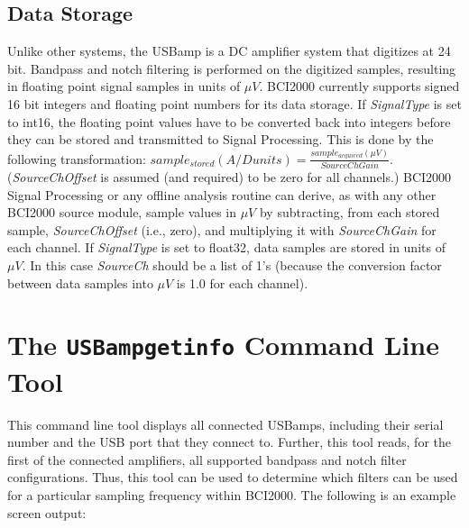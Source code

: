 \documentclass[letterpaper, oneside, 12pt]{article}
\begin{document}
\subsection{Data Storage}

Unlike other systems, the USBamp is a DC amplifier system that digitizes at 24 
bit. Bandpass and notch filtering is performed on the digitized samples, 
resulting in floating point signal samples in units of $\mu V$. BCI2000 
currently supports signed 16 bit integers and floating point numbers for its data storage.
If \emph{SignalType} is set to int16, the floating point values have 
to be converted back into integers before they can be stored and transmitted to 
Signal Processing. This is done by the following transformation: 
$sample_{stored}(A/D units)=\frac{sample_{acquired}(\mu V)}{SourceChGain}$. 
(\emph{SourceChOffset} is assumed (and required) to be zero for all channels.) 
BCI2000 Signal Processing or any offline analysis routine can derive, as with 
any other BCI2000 source module, sample values in $\mu V$ by subtracting, from 
each stored sample, \emph{SourceChOffset} (i.e., zero), and multiplying it with 
\emph{SourceChGain} for each channel. If \emph{SignalType} is set to float32,
data samples are stored in units of $\mu V$. In this case \emph{SourceCh} should be
a list of 1's (because the conversion factor between data samples into $\mu V$ is
1.0 for each channel).

\section{The \texttt{USBampgetinfo} Command Line Tool}

This command line tool displays all connected USBamps, including their serial 
number and the USB port that they connect to. Further, this tool reads, for the 
first of the connected amplifiers, all supported bandpass and notch filter 
configurations. Thus, this tool can be used to determine which filters can be 
used for a particular sampling frequency within BCI2000. The following is an 
example screen output:
\end{document}

